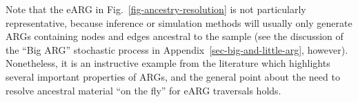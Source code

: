 \documentclass{article}
\newcommand{\noderef}[1]{\textsf{#1}}
\begin{document}
Note that the \citet{wiuf1999recombination} eARG
in Fig.~\ref{fig-ancestry-resolution} is not particularly
representative, because inference or simulation methods will usually
only generate ARGs containing nodes and edges ancestral to the sample
(see the discussion of the ``Big ARG'' stochastic process in
Appendix~\ref{sec-big-and-little-arg}, however).
Nonetheless, it is an instructive example from the literature which highlights several
important properties of ARGs, and the general point about
the need to resolve ancestral material ``on the fly'' for eARG traversals
holds.


\end{document}
